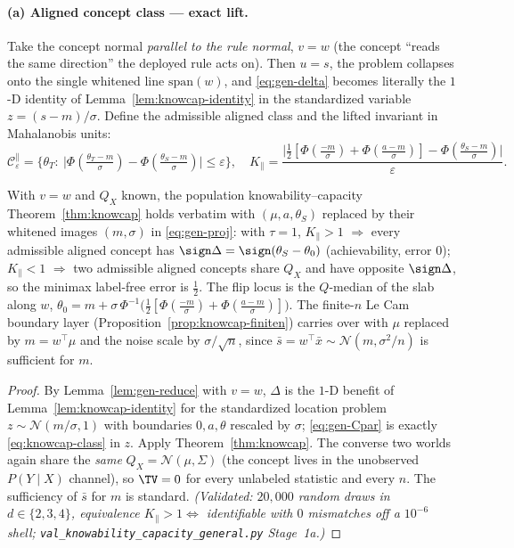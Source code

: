 \paragraph{(a) Aligned concept class --- exact lift.}
Take the concept normal \emph{parallel to the rule normal}, $v=w$ (the concept
``reads the same direction'' the deployed rule acts on). Then $u=s$, the problem
collapses onto the single whitened line $\mathrm{span}(w)$, and \eqref{eq:gen-delta}
becomes literally the $1$-D identity of Lemma~\ref{lem:knowcap-identity} in the
standardized variable $z=(s-m)/\sigma$. Define the admissible aligned class and the
lifted invariant in Mahalanobis units:
\begin{equation}\label{eq:gen-Cpar}
  \mathcal C_\varepsilon^{\parallel}=\Big\{\theta_T:\ \big|\Phi(\tfrac{\theta_T-m}{\sigma})
  -\Phi(\tfrac{\theta_S-m}{\sigma})\big|\le\varepsilon\Big\},\quad
  K_\parallel=\frac{\big|\tfrac12[\Phi(\tfrac{-m}{\sigma})+\Phi(\tfrac{a-m}{\sigma})]
  -\Phi(\tfrac{\theta_S-m}{\sigma})\big|}{\varepsilon}.
\end{equation}

\begin{theorem}\label{thm:gen-aligned}
With $v=w$ and $Q_X$ known, the population knowability--capacity
Theorem~\ref{thm:knowcap} holds verbatim with $(\mu,a,\theta_S)$ replaced by their
whitened images $(m,\sigma)$ in \eqref{eq:gen-proj}: with $\tau=1$,
$K_\parallel>1$ $\Rightarrow$ every admissible aligned concept has
$\sign\Delta=\sign(\theta_S-\theta_0)$ (achievability, error $0$); $K_\parallel<1$
$\Rightarrow$ two admissible aligned concepts share $Q_X$ and have opposite
$\sign\Delta$, so the minimax label-free error is $\tfrac12$. The flip locus is the
$Q$-median of the slab along $w$, $\theta_0=m+\sigma\,\Phi^{-1}\!\big(\tfrac12[\Phi(\tfrac{-m}{\sigma})+\Phi(\tfrac{a-m}{\sigma})]\big)$.
The finite-$n$ Le Cam boundary layer (Proposition~\ref{prop:knowcap-finiten}) carries
over with $\mu$ replaced by $m=w^\top\mu$ and the noise scale by $\sigma/\sqrt n$,
since $\bar s=w^\top\bar x\sim\mathcal N(m,\sigma^2/n)$ is sufficient for $m$.
\end{theorem}
\begin{proof}
By Lemma~\ref{lem:gen-reduce} with $v=w$, $\Delta$ is the $1$-D benefit of
Lemma~\ref{lem:knowcap-identity} for the standardized location problem
$z\sim\mathcal N(m/\sigma,1)$ with boundaries $0,a,\theta$ rescaled by $\sigma$;
\eqref{eq:gen-Cpar} is exactly \eqref{eq:knowcap-class} in $z$. Apply
Theorem~\ref{thm:knowcap}. The converse two worlds again share the \emph{same}
$Q_X=\mathcal N(\mu,\Sigma)$ (the concept lives in the unobserved $P(Y\mid X)$
channel), so $\TV=0$ for every unlabeled statistic and every $n$. The sufficiency of
$\bar s$ for $m$ is standard. \emph{(Validated: $20{,}000$ random draws in
$d\in\{2,3,4\}$, equivalence $K_\parallel>1\iff$ identifiable with $0$ mismatches off
a $10^{-6}$ shell; \texttt{val\_knowability\_capacity\_general.py} Stage~1a.)}
\end{proof}

